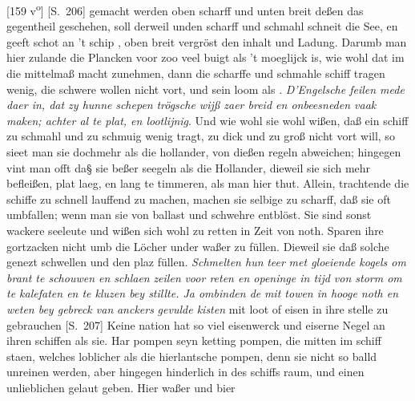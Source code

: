 [159 v\textsuperscript{o}]  [S.~206] gemacht werden oben scharff und unten breit deßen das gegentheil geschehen,  soll derweil unden scharff und schmahl schneit die See, en geeft schot an 't schip\protect{} ,  oben breit vergr\"{o}st den inhalt und  Ladung. Darumb man hier  zulande die Plancken voor zoo veel buigt als 't moeglijck is, wie  wohl dat im die mittelmaß macht zunehmen, dann die scharffe und  schmahle schiff\protect{} tragen wenig, die schwere wollen nicht vort, und  sein loom als . \textit{D'Engelsche feilen mede daer in, dat zy  hunne }\textit{schepen}\protect{}\textit{ tr\"{o}gsche wijß zaer breid en onbeesneden vaak  maken; achter al te plat, en lootlijnig}. Und wie wohl  sie wohl wißen, daß ein schiff\protect{} zu schmahl und zu schmuig wenig  tragt, zu dick und zu groß nicht vort will, so sieet man sie dochmehr als die hollander, von dießen regeln abweichen; hingegen vint  man offt da§ sie beßer seegeln als die Hollander, dieweil sie sich mehr befleißen, plat laeg, en lang te timmeren, als man hier thut. Allein, trachtende die schiff\protect{}e zu schnell lauffend zu machen, machen sie selbige zu  scharff, daß sie oft umbfallen; wenn man sie von ballast und schwehre entbl\"{o}st. Sie sind sonst wackere seeleute und wißen sich wohl zu retten in  Zeit von noth. Sparen ihre gort\textendash zacken\protect{} nicht umb die L\"{o}cher under  waßer zu f\"{u}llen. Dieweil sie  daß solche genezt schwellen  und den plaz f\"{u}llen. \textit{Schmelten hun }\textit{teer}\protect{}\textit{ met gloeiende kogels  om brant te schouwen en schlaen }\textit{zeilen}\protect{}\textit{ voor reten en openinge  in tijd von storm om te kalefaten en te kluzen bey stillte.  Ja ombinden de }\textit{ mit towen in hooge noth en weten bey  gebreck van }\textit{anckers}\protect{}\textit{ gevulde kisten} mit loot  of eisen\protect{} in  ihre stelle zu gebrauchen [S.~207] Keine nation hat so viel eisenwerck und eiserne Negel\protect{} an ihren schiffen\protect{} als sie. Har pompen\protect{}  seyn ketting pompen\protect{}, die mitten im schiff\protect{} staen, welches loblicher  als die hierlantsche pompen\protect{}, denn sie nicht so balld unreinen werden,  aber hingegen hinderlich in des schiffs\protect{} raum, und einen unlieblichen  gelaut geben. Hier waßer und bier 